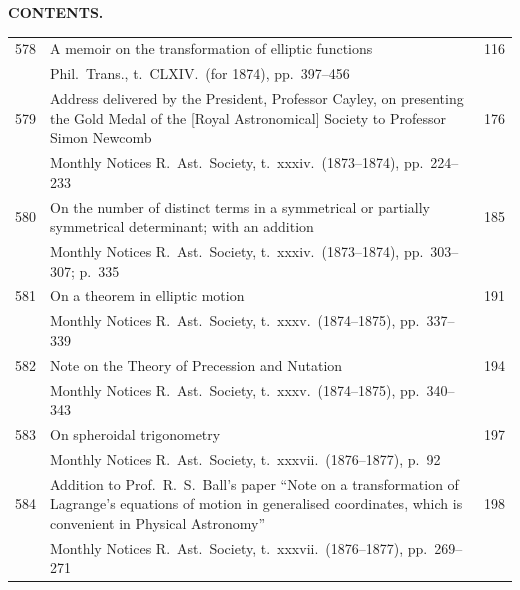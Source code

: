 \documentclass[11pt,a4paper]{book}
\begin{document}

\newpage

\begin{center}
{\large \textbf{CONTENTS.}}
\end{center}

\vspace{12pt}

\noindent
\begin{longtable}{r @{. } p{4.8in} r}
578 & A memoir on the transformation of elliptic functions & 116 \\
  & Phil.\ Trans., t.\ CLXIV.\ (for 1874), pp.\ 397--456 & \\ 

579 & Address delivered by the President, Professor Cayley, on presenting the Gold Medal of the [Royal Astronomical] Society to Professor Simon Newcomb & 176 \\
  & Monthly Notices R.\ Ast.\ Society, t.\ xxxiv.\ (1873--1874), pp.\ 224--233 & \\ 

580 & On the number of distinct terms in a symmetrical or partially symmetrical determinant; with an addition & 185 \\
  & Monthly Notices R.\ Ast.\ Society, t.\ xxxiv.\ (1873--1874), pp.\ 303--307; p.\ 335 & \\ 

581 & On a theorem in elliptic motion & 191 \\
  & Monthly Notices R.\ Ast.\ Society, t.\ xxxv.\ (1874--1875), pp.\ 337--339 & \\ 

582 & Note on the Theory of Precession and Nutation & 194 \\
  & Monthly Notices R.\ Ast.\ Society, t.\ xxxv.\ (1874--1875), pp.\ 340--343 & \\ 

583 & On spheroidal trigonometry & 197 \\
  & Monthly Notices R.\ Ast.\ Society, t.\ xxxvii.\ (1876--1877), p.\ 92 & \\ 

584 & Addition to Prof.\ R.\ S.\ Ball's paper ``Note on a transformation of Lagrange's equations of motion in generalised coordinates, which is convenient in Physical Astronomy'' & 198 \\
  & Monthly Notices R.\ Ast.\ Society, t.\ xxxvii.\ (1876--1877), pp.\ 269--271 & \\ 


\end{longtable}
\end{document}
